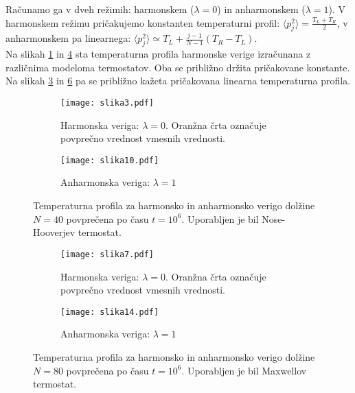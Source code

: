 \documentclass[a4paper]{article}
\begin{document}
    Računamo ga v dveh režimih: harmonskem ($\lambda = 0$) in anharmonskem ($\lambda = 1$).
    V harmonskem režimu pričakujemo konstanten temperaturni profil: $\langle p_j^2 \rangle = \frac{T_L + T_R}{2}$, v
    anharmonskem pa linearnega: $\langle p_j^2 \rangle \simeq T_L + \frac{j - 1}{N - 1}(T_R - T_L)$. \\

    Na slikah \ref{slika1} in \ref{slika3} sta temperaturna profila harmonske verige izračunana z različnima modeloma
    termostatov.
    Oba se približno držita pričakovane konstante.
    Na slikah \ref{slika2} in \ref{slika4} pa se približno kažeta pričakovana linearna temperaturna profila.


    \begin{figure}
        \centering
        \begin{subfigure}{\textwidth}
            \texttt{[image: slika3.pdf]}
            \caption{Harmonska veriga: $\lambda = 0$.
            Oranžna črta označuje povprečno vrednost vmesnih vrednosti.}
            \label{slika1}
        \end{subfigure}
        \begin{subfigure}{\textwidth}
            \texttt{[image: slika10.pdf]}
            \caption{Anharmonska veriga: $\lambda = 1$}
            \label{slika2}
        \end{subfigure}
        \caption{Temperaturna profila za harmonsko in anharmonsko verigo dolžine $N = 40$ povprečena po času $t = 10^6$.
        Uporabljen je bil Nose-Hooverjev termostat.}
    \end{figure}

    \begin{figure}
        \centering
        \begin{subfigure}{\textwidth}
            \texttt{[image: slika7.pdf]}
            \caption{Harmonska veriga: $\lambda = 0$.
            Oranžna črta označuje povprečno vrednost vmesnih vrednosti.}
            \label{slika3}
        \end{subfigure}
        \begin{subfigure}{\textwidth}
            \texttt{[image: slika14.pdf]}
            \caption{Anharmonska veriga: $\lambda = 1$}
            \label{slika4}
        \end{subfigure}
        \caption{Temperaturna profila za harmonsko in anharmonsko verigo dolžine $N = 80$ povprečena po času $t = 10^6$.
        Uporabljen je bil Maxwellov termostat.}
    \end{figure}
\end{document}
